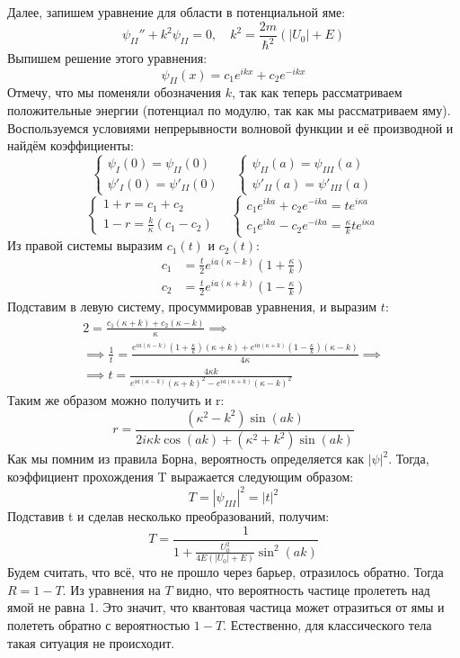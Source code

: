 Далее, запишем уравнение для области в потенциальной яме:
\[
\psi_{II}'' + k^2\psi_{II} = 0, \quad k^2 = \frac{2m}{\hbar^2}(|U_0| + E)
\]
Выпишем решение этого уравнения:
\[
\psi_{II}(x) = c_1e^{ikx} + c_2e^{-ikx}
\]
Отмечу, что мы поменяли обозначения $k$, так как теперь рассматриваем положительные энергии (потенциал по модулю, так как мы рассматриваем яму). Воспользуемся условиями непрерывности волновой функции и её производной и найдём коэффициенты:
\[
\begin{cases}
    \psi_I(0) = \psi_{II}(0) \\
    \psi'_I(0) = \psi'_{II}(0) 
\end{cases}
\quad
\begin{cases}
    \psi_{II}(a) = \psi_{III}(a) \\
    \psi'_{II}(a) = \psi'_{III}(a) 
\end{cases}
\]
\[
\begin{cases}
    1 + r = c_1 + c_2 \\
    1-r = \frac{k}{\kappa}(c_1 - c_2) 
\end{cases}
\quad
\begin{cases}
    c_1e^{ika} + c_2e^{-ika} = te^{i\kappa a}\\
    c_1e^{ika} - c_2e^{-ika} = \frac{\kappa}{k}te^{i\kappa a}
\end{cases}
\]
Из правой системы выразим $c_1(t)$ и $c_2(t)$:
\begin{align*}
c_1 &= \frac{t}{2}e^{ia(\kappa - k)}(1 + \frac{\kappa}{k})\\
c_2 &= \frac{t}{2}e^{ia(\kappa + k)}(1 - \frac{\kappa}{k})
\end{align*}
Подставим в левую систему, просуммировав уравнения, и выразим $t$:
\begin{gather*}
2 = \frac{c_1(\kappa + k) + c_2 (\kappa - k)}{\kappa}  \implies \\ 
\implies \frac{1}{t} = \frac{e^{ia(\kappa - k)}(1 + \frac{\kappa}{k})(\kappa + k) + e^{ia(\kappa + k)}(1 - \frac{\kappa}{k}) (\kappa - k) }{4\kappa} \implies \\
\implies t = \frac{4\kappa k}{e^{ia(\kappa - k)}(\kappa + k)^2 - e^{ia(\kappa + k)}(\kappa - k)^2 }
\end{gather*}
Таким же образом можно получить и r:
\[
r = \frac{(\kappa^2 - k^2)\sin (ak)}{2i\kappa k\cos(ak) + (\kappa^2 + k^2)\sin (ak)}
\]
Как мы помним из правила Борна, вероятность определяется как $|\psi|^2$. Тогда, коэффициент прохождения T выражается следующим образом:
\[
T = |\psi_{III}|^2 = |t|^2
\]
Подставив t и сделав несколько преобразований, получим:
\[
T = \frac{1}{1 + \frac{U_0^2}{4E(|U_0| + E)}\sin^2 (ak)}
\]
Будем считать, что всё, что не прошло через барьер, отразилось обратно. Тогда $R = 1 - T$. Из уравнения на $T$ видно, что вероятность частице пролететь над ямой не равна 1. Это значит, что квантовая частица может отразиться от ямы и полететь обратно с вероятностью $1 - T$. Естественно, для классического тела такая ситуация не происходит.

